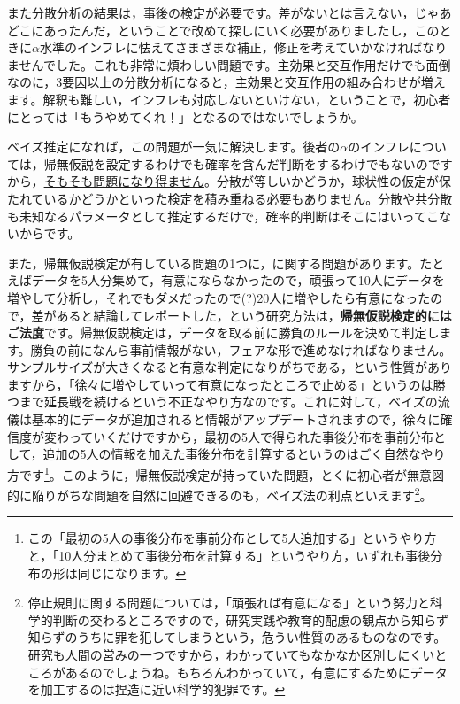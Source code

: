 \documentclass{ltjbook}
\begin{document}
また分散分析の結果は，事後の検定が必要です。差がないとは言えない，じゃあどこにあったんだ，ということで改めて探しにいく必要がありましたし，このときに$\alpha$水準のインフレに怯えてさまざまな補正，修正を考えていかなければなりませんでした。これも非常に煩わしい問題です。主効果と交互作用だけでも面倒なのに，3要因以上の分散分析になると，主効果と交互作用の組み合わせが増えます。解釈も難しい，インフレも対応しないといけない，ということで，初心者にとっては「もうやめてくれ！」となるのではないでしょうか。

ベイズ推定になれば，この問題が一気に解決します。後者の$\alpha$のインフレについては，帰無仮説を設定するわけでも確率を含んだ判断をするわけでもないのですから，\underline{そもそも問題になり得ません}。分散が等しいかどうか，球状性の仮定が保たれているかどうかといった検定を積み重ねる必要もありません。分散や共分散も未知なるパラメータとして推定するだけで，確率的判断はそこにはいってこないからです。

また，帰無仮説検定が有している問題の1つに，に関する問題があります。たとえばデータを5人分集めて，有意にならなかったので，頑張って10人にデータを増やして分析し，それでもダメだったので(?)20人に増やしたら有意になったので，差があると結論してレポートした，という研究方法は，\textbf{帰無仮説検定的にはご法度}です。帰無仮説検定は，データを取る前に勝負のルールを決めて判定します。勝負の前になんら事前情報がない，フェアな形で進めなければなりません。サンプルサイズが大きくなると有意な判定になりがちである，という性質がありますから，「徐々に増やしていって有意になったところで止める」というのは勝つまで延長戦を続けるという不正なやり方なのです。これに対して，ベイズの流儀は基本的にデータが追加されると情報がアップデートされますので，徐々に確信度が変わっていくだけですから，最初の5人で得られた事後分布を事前分布として，追加の5人の情報を加えた事後分布を計算するというのはごく自然なやり方です\footnote{この「最初の5人の事後分布を事前分布として5人追加する」というやり方と，「10人分まとめて事後分布を計算する」というやり方，いずれも事後分布の形は同じになります。}。このように，帰無仮説検定が持っていた問題，とくに初心者が無意図的に陥りがちな問題を自然に回避できるのも，ベイズ法の利点といえます\footnote{停止規則に関する問題については，「頑張れば有意になる」という努力と科学的判断の交わるところですので，研究実践や教育的配慮の観点から知らず知らずのうちに罪を犯してしまうという，危うい性質のあるものなのです。研究も人間の営みの一つですから，わかっていてもなかなか区別しにくいところがあるのでしょうね。もちろんわかっていて，有意にするためにデータを加工するのは捏造に近い科学的犯罪です。}。
\end{document}

